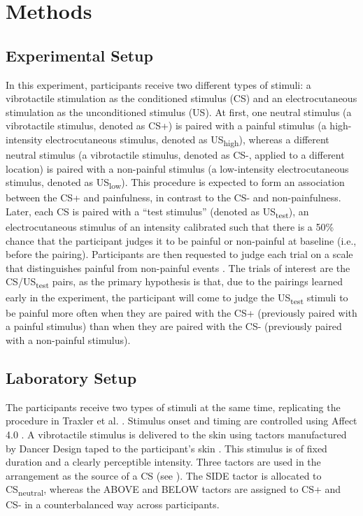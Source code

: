 \documentclass{article}
\begin{document}
\section{Methods} 

\subsection{Experimental Setup} 

In this experiment, participants receive two different types of stimuli: a vibrotactile stimulation as the conditioned stimulus (CS) and an electrocutaneous stimulation as the unconditioned stimulus (US). At first, one neutral stimulus (a vibrotactile stimulus, denoted as CS+) is paired with a painful stimulus (a high-intensity electrocutaneous stimulus, denoted as US\textsubscript{high}), whereas a different neutral stimulus (a vibrotactile stimulus, denoted as CS-, applied to a different location) is paired with a non-painful stimulus (a low-intensity electrocutaneous stimulus, denoted as US\textsubscript{low}). This procedure is expected to form an association between the CS+ and painfulness, in contrast to the CS- and non-painfulness. Later, each CS is paired with a “test stimulus” (denoted as US\textsubscript{test}), an electrocutaneous stimulus of an intensity calibrated such that there is a 50\% chance that the participant judges it to be painful or non-painful at baseline (i.e., before the pairing). Participants are then requested to judge each trial on a scale that distinguishes painful from non-painful events \autocite{bib40}. The trials of interest are the CS/US\textsubscript{test} pairs, as the primary hypothesis is that, due to the pairings learned early in the experiment, the participant will come to judge the US\textsubscript{test} stimuli to be painful more often when they are paired with the CS+ (previously paired with a painful stimulus) than when they are paired with the CS- (previously paired with a non-painful stimulus).

\subsection{Laboratory Setup} 

The participants receive two types of stimuli at the same time, replicating the procedure in Traxler et al. \autocite{bib7}. Stimulus onset and timing are controlled using Affect 4.0 \autocite{bib41}. A vibrotactile stimulus is delivered to the skin using tactors manufactured by Dancer Design taped to the participant's skin \autocite{bib42}. This stimulus is of fixed duration and a clearly perceptible intensity. Three tactors are used in the arrangement as the source of a CS (see \autocite{bibFigure 1}). The SIDE tactor is allocated to CS\textsubscript{neutral}, whereas the ABOVE and BELOW tactors are assigned to CS+ and CS- in a counterbalanced way across participants.
\end{document}
